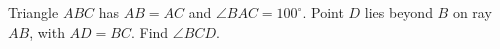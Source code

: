 Triangle $ABC$ has $AB=AC$ and $\angle BAC=100^\circ$. Point $D$ lies beyond $B$ on ray $AB$, with $AD=BC$. Find $\angle BCD$.
